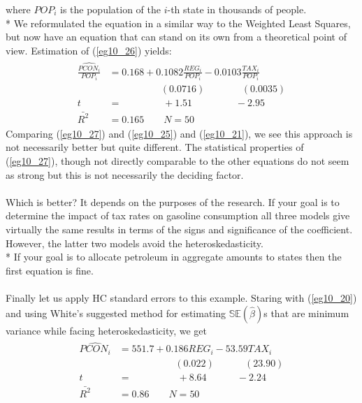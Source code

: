 \documentclass[11pt]{article}
\begin{document}
where $POP_i$ is the population of the $i$-th state in thousands of people.\\*
We reformulated the equation in a similar way to the Weighted Least Squares, but now have an equation that can stand on its own from a theoretical point of view. Estimation of (\ref{eg10_26}) yields:
\begin{align}
\label{eg10_27}
\begin{split}
\widehat{\frac{PCON_i}{POP_i}} &= 0.168+ 0.1082\frac{REG_i}{POP_i} - 0.0103\frac{TAX_i}{POP_i}\\
&\>\>\>\>\>\>\>\>\>\>\>\>\>\>\>\>\>\>\>\>\>\>\>\> (0.0716) 
\>\>\>\>\>\>\>\>\>\>\>\>\>\>\>\>\> (0.0035)\\
t&=\>\>\>\>\>\>\>\>\>\>\>\>\>\>\>\>\>\>\> +1.51 
\>\>\>\>\>\>\>\>\>\>\>\>\>\>\>\>\>\>\>\> -2.95\\
\bar{R^2}&= 0.165 \quad\quad N=50
\end{split}
\end{align}
Comparing (\ref{eg10_27}) and (\ref{eg10_25}) and (\ref{eg10_21}), we see this approach is not necessarily better but quite different. The statistical properties of (\ref{eg10_27}), though not directly comparable to the other equations do not seem as strong but this is not necessarily the deciding factor.\\ \\
Which is better? It depends on the purposes of the research. If your goal is to determine the impact of tax rates on gasoline consumption all three models give virtually the same results in terms of the signs and significance of the coefficient. However, the latter two models avoid the heteroskedasticity.\\*
If your goal is to allocate petroleum in aggregate amounts to states then the first equation is fine.\\ \\
Finally let us apply HC standard errors to this example. Staring with (\ref{eg10_20}) and using White's suggested method for estimating $\mathbb{SE}(\hat{\beta})$s that are minimum variance while facing heteroskedasticity, we get
\begin{align}
\label{eg10_28}
\begin{split}
\widehat{PCON_i} &= 551.7 + {0.186REG_i} - {53.59TAX_i}\\
&\>\>\>\>\>\>\>\>\>\>\>\>\>\>\>\>\>\>\>\>\>\>\>\>\>\> (0.022) 
\>\>\>\>\>\>\>\>\>\>\>\>\>\> (23.90)\\
t&=\>\>\>\>\>\>\>\>\>\>\>\>\>\>\>\>\>\>\>\>\> +8.64 
\>\>\>\>\>\>\>\>\>\>\>\>\>\> -2.24\\
\bar{R^2}&= 0.86 \quad\quad N=50
\end{split}
\end{align}
\end{document}
